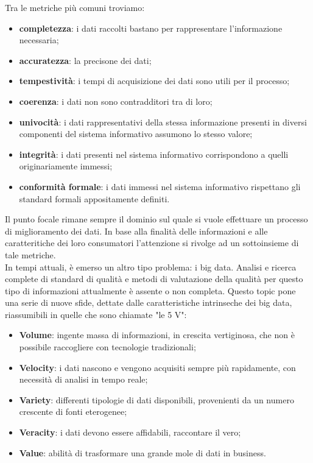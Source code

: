 \documentclass[a4paper,12pt]{article}
\begin{document}
Tra le metriche più comuni troviamo:

\begin{itemize}
\item \textbf{completezza}: i dati raccolti bastano per rappresentare l'informazione necessaria; 
\item \textbf{accuratezza}: la precisone dei dati;
\item \textbf{tempestività}: i tempi di acquisizione dei dati sono utili per il processo;
\item \textbf{coerenza}: i dati non sono contradditori tra di loro;
\item \textbf{univocità}: i dati rappresentativi della stessa informazione presenti in diversi componenti del sistema informativo assumono lo stesso valore;
\item \textbf{integrità}: i dati presenti nel sistema informativo corrispondono a quelli originariamente immessi;
\item \textbf{conformità formale}: i dati immessi nel sistema informativo rispettano gli standard formali appositamente definiti.
\end{itemize} 

\bigskip

\noindent Il punto focale rimane sempre il dominio sul quale si vuole effettuare un processo di miglioramento dei dati. In base alla finalità delle informazioni e alle caratteritiche dei loro consumatori l'attenzione si rivolge ad un sottoinsieme di tale metriche.\\
In tempi attuali, è emerso un altro tipo problema: i big data. Analisi e ricerca complete di standard di qualità e metodi di valutazione della qualità per questo tipo di informazioni attualmente è assente o non completa. Questo topic pone una serie di nuove sfide, dettate dalle caratteristiche intrinseche dei big data, riassumibili in quelle che sono chiamate "le 5 V":
\begin{itemize}
	\item \textbf{Volume}: ingente massa di informazioni, in crescita vertiginosa, che non è possibile raccogliere con tecnologie tradizionali;
	\item \textbf{Velocity}: i dati nascono e vengono acquisiti sempre più rapidamente, con necessità di analisi in tempo reale;
	\item \textbf{Variety}: differenti tipologie di dati disponibili, provenienti da un numero crescente di fonti eterogenee;
	\item \textbf{Veracity}: i dati devono essere affidabili, raccontare il vero;
	\item \textbf{Value}: abilità di trasformare una grande mole di dati in business.
\end{itemize}
\end{document}
